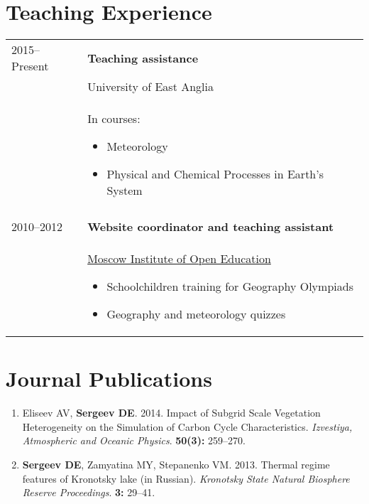 \documentclass[a4paper,11pt]{article}
\makeatletter
\newlength{\mycol}
\newlength{\bibhang}
\newlength{\bibsep}
 {\@listi \global\bibsep\itemsep \global\advance\bibsep by\parsep}
\newenvironment{bibsection}%
        {\begin{enumerate}{}{%
       \setlength{\leftmargin}{\bibhang}%
       \setlength{\itemindent}{-\leftmargin}%
       \setlength{\itemsep}{\bibsep}%
       \setlength{\parsep}{\z@}%
        \setlength{\partopsep}{0pt}%
        \setlength{\topsep}{0pt}}}
        {\end{enumerate}\vspace{-.6\baselineskip}}
\makeatother
\begin{document}
\section{Teaching Experience}
\begin{tabu} to 
2015--\small{Present} & \textbf{Teaching assistance} \\
& University of East Anglia \\
& In courses: 
\begin{itemize}
\item Meteorology
\item Physical and Chemical Processes in Earth's System
\end{itemize} \\
 \\

2010--2012 & \textbf{Website coordinator and teaching assistant} \\
& \href{http://www.mioo.ru/}{Moscow Institute of Open Education} 
\begin{itemize}
\item Schoolchildren training for Geography Olympiads
\item Geography and meteorology quizzes
\end{itemize}
\end{tabu}

\section{Journal Publications}
\begin{bibsection}
    \item Eliseev AV, {\bf Sergeev DE}. 2014. Impact of Subgrid Scale Vegetation Heterogeneity on the Simulation of Carbon Cycle Characteristics. \emph{Izvestiya, Atmospheric and Oceanic Physics}. \textbf{50(3):} 259--270.
    \item {\bf Sergeev DE}, Zamyatina MY, Stepanenko VM. 2013. Thermal regime features of Kronotsky lake (in Russian). \emph{Kronotsky State Natural Biosphere Reserve Proceedings}. \textbf{3:} 29--41.
\end{bibsection}
\end{document}
